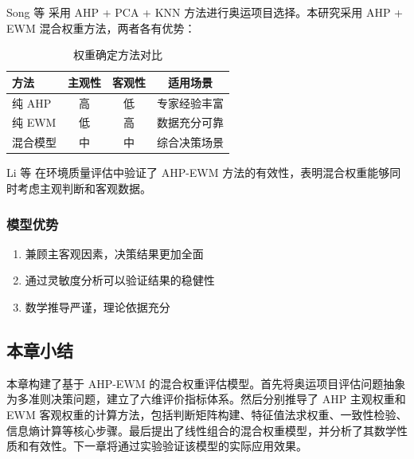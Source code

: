 Song 等\cite{song2025quantifying} 采用 AHP + PCA + KNN 方法进行奥运项目选择。本研究采用 AHP + EWM 混合权重方法，两者各有优势：

\begin{table}[htbp]
    \centering
    \caption{权重确定方法对比}
    \label{tab:comparison}
    \begin{tabular}{lccc}
        \toprule
        方法 & 主观性 & 客观性 & 适用场景 \\
        \midrule
        纯 AHP & 高 & 低 & 专家经验丰富 \\
        纯 EWM & 低 & 高 & 数据充分可靠 \\
        混合模型 & 中 & 中 & 综合决策场景 \\
        \bottomrule
    \end{tabular}
\end{table}

Li 等\cite{li2025evaluation} 在环境质量评估中验证了 AHP-EWM 方法的有效性，表明混合权重能够同时考虑主观判断和客观数据。

\subsubsection{模型优势}

\begin{enumerate}
    \item 兼顾主客观因素，决策结果更加全面
    \item 通过灵敏度分析可以验证结果的稳健性
    \item 数学推导严谨，理论依据充分
\end{enumerate}

\subsection{本章小结}
\label{subsec:summary}

本章构建了基于 AHP-EWM 的混合权重评估模型。首先将奥运项目评估问题抽象为多准则决策问题，建立了六维评价指标体系。然后分别推导了 AHP 主观权重\cite{saaty2007analytic}和 EWM 客观权重\cite{wang2019comprehensive}的计算方法，包括判断矩阵构建、特征值法求权重、一致性检验、信息熵计算等核心步骤。最后提出了线性组合的混合权重模型\cite{zhang2023risk}，并分析了其数学性质和有效性。下一章将通过实验验证该模型的实际应用效果。